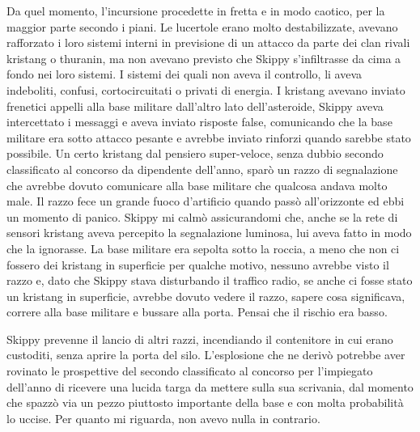 Da quel momento, l'incursione procedette in fretta e in modo caotico,
per la maggior parte secondo i piani. Le lucertole erano molto
destabilizzate, avevano rafforzato i loro sistemi interni in previsione
di un attacco da parte dei clan rivali kristang o thuranin, ma non
avevano previsto che Skippy s'infiltrasse da cima a fondo nei loro
sistemi. I sistemi dei quali non aveva il controllo, li aveva
indeboliti, confusi, cortocircuitati o privati di energia. I kristang
avevano inviato frenetici appelli alla base militare dall'altro lato
dell'asteroide, Skippy aveva intercettato i messaggi e aveva inviato
risposte false, comunicando che la base militare era sotto attacco
pesante e avrebbe inviato rinforzi quando sarebbe stato possibile. Un
certo kristang dal pensiero super-veloce, senza dubbio secondo
classificato al concorso da dipendente dell'anno, sparò un razzo di
segnalazione che avrebbe dovuto comunicare alla base militare che
qualcosa andava molto male. Il razzo fece un grande fuoco d'artificio
quando passò all'orizzonte ed ebbi un momento di panico. Skippy mi calmò
assicurandomi che, anche se la rete di sensori kristang aveva percepito
la segnalazione luminosa, lui aveva fatto in modo che la ignorasse. La
base militare era sepolta sotto la roccia, a meno che non ci fossero dei
kristang in superficie per qualche motivo, nessuno avrebbe visto il
razzo e, dato che Skippy stava disturbando il traffico radio, se anche
ci fosse stato un kristang in superficie, avrebbe dovuto vedere il
razzo, sapere cosa significava, correre alla base militare e bussare
alla porta. Pensai che il rischio era basso.

Skippy prevenne il lancio di altri razzi, incendiando il contenitore in
cui erano custoditi, senza aprire la porta del silo. L'esplosione che ne
derivò potrebbe aver rovinato le prospettive del secondo classificato al
concorso per l'impiegato dell'anno di ricevere una lucida targa da
mettere sulla sua scrivania, dal momento che spazzò via un pezzo
piuttosto importante della base e con molta probabilità lo uccise. Per
quanto mi riguarda, non avevo nulla in contrario.

